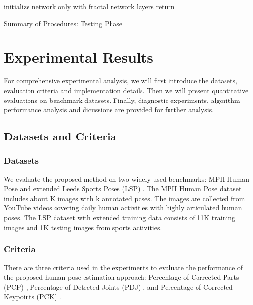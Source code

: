 \documentclass[journal ]{IEEEtran}
\begin{document}
\begin{algorithm}[h]
	\SetAlgoLined
	
	
	
	initialize network only with fractal network layers  \;
    return 
\caption{Summary of Procedures: Testing Phase}
\label{algorithm:testing}
\end{algorithm}

\section{Experimental Results}

For comprehensive experimental analysis, we will first introduce the datasets, evaluation criteria and implementation details. Then we will present quantitative evaluations on benchmark datasets. Finally, diagnostic experiments, algorithm performance analysis and dicussions are provided for further analysis.

\label{sec:experiments}
\subsection{Datasets and Criteria}
\subsubsection{Datasets}
We evaluate the proposed method on two widely used benchmarks: MPII Human Pose \cite{andriluka20142d} and extended Leeds Sports Poses (LSP) \cite{johnson2010clustered}. The MPII Human Pose dataset includes about K images with k annotated poses. The images are collected from YouTube videos covering daily human activities with highly articulated human poses. The LSP dataset with extended training data consists of 11K training images and 1K testing images from sports activities.

\subsubsection{Criteria}
There are three criteria used in the experiments to evaluate the performance of the proposed human pose estimation approach: Percentage of Corrected Parts (PCP) \cite{yang2013articulated, ferrari2008progressive, eichner20122d}, Percentage of Detected Joints (PDJ) \cite{toshev2014deeppose, sapp2013modec, yang2013articulated}, and Percentage of Corrected Keypoints (PCK) \cite{yang2013articulated}.
\end{document}
